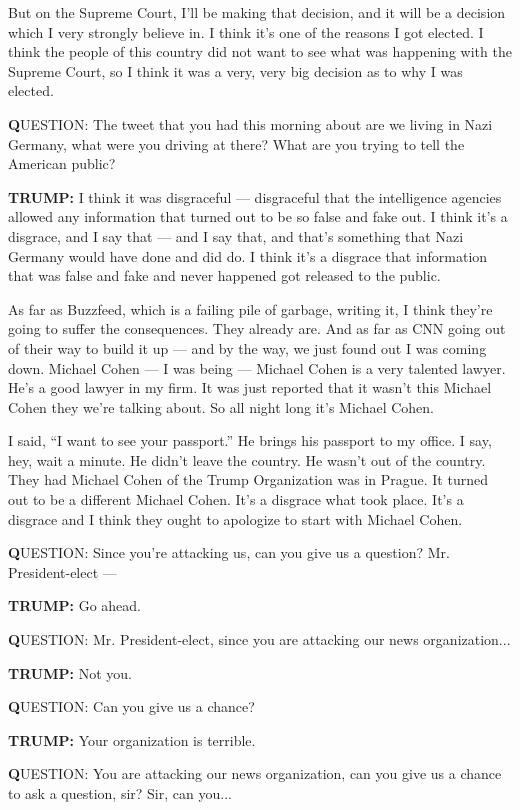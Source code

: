 But on the Supreme Court, I'll be making that decision, and it will be a
decision which I very strongly believe in. I think it's one of the
reasons I got elected. I think the people of this country did not want
to see what was happening with the Supreme Court, so I think it was a
very, very big decision as to why I was elected.

\textbf{Q}UESTION: The tweet that you had this morning about are we
living in Nazi Germany, what were you driving at there? What are you
trying to tell the American public?

\textbf{TRUMP:} I think it was disgraceful --- disgraceful that the
intelligence agencies allowed any information that turned out to be so
false and fake out. I think it's a disgrace, and I say that --- and I
say that, and that's something that Nazi Germany would have done and did
do. I think it's a disgrace that information that was false and fake and
never happened got released to the public.

As far as Buzzfeed, which is a failing pile of garbage, writing it, I
think they're going to suffer the consequences. They already are. And as
far as CNN going out of their way to build it up --- and by the way, we
just found out I was coming down. Michael Cohen --- I was being ---
Michael Cohen is a very talented lawyer. He's a good lawyer in my firm.
It was just reported that it wasn't this Michael Cohen they we're
talking about. So all night long it's Michael Cohen.

I said, ``I want to see your passport.'' He brings his passport to my
office. I say, hey, wait a minute. He didn't leave the country. He
wasn't out of the country. They had Michael Cohen of the Trump
Organization was in Prague. It turned out to be a different Michael
Cohen. It's a disgrace what took place. It's a disgrace and I think they
ought to apologize to start with Michael Cohen.

\textbf{Q}UESTION: Since you're attacking us, can you give us a
question? Mr. President-elect ---

\textbf{TRUMP:} Go ahead.

\textbf{Q}UESTION: Mr. President-elect, since you are attacking our news
organization...

\textbf{TRUMP:} Not you.

\textbf{Q}UESTION: Can you give us a chance?

\textbf{TRUMP:} Your organization is terrible.

\textbf{Q}UESTION: You are attacking our news organization, can you give
us a chance to ask a question, sir? Sir, can you...

